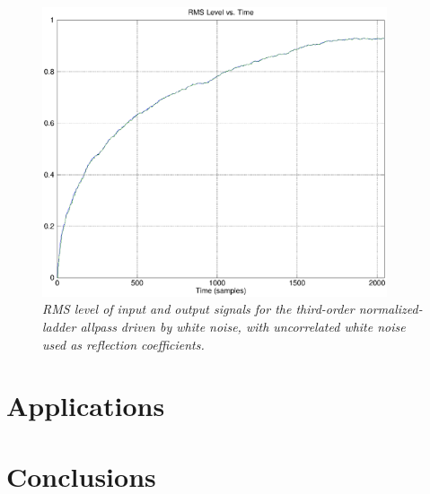 \documentclass[twoside,a4paper]{article}
\begin{document}
\begin{figure}[ht]
\center
\includegraphics[width=4in]{eps/tapnn2.eps}
\caption{\label{tapnn2}{\it RMS level of input and output signals
for the third-order normalized-ladder allpass driven by white noise,
with uncorrelated white noise used as reflection coefficients.}}
\end{figure} 

\section{Applications}

\section{Conclusions}

{\small\raggedright
\nocite{*}


}
\end{document}
